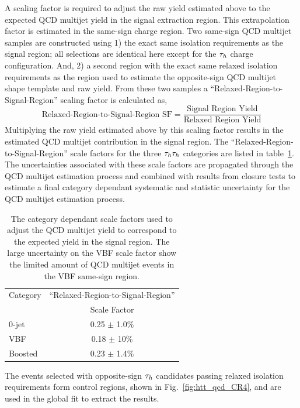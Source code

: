 A scaling factor is required to adjust the raw yield estimated above to the expected
QCD multijet yield in the signal extraction region. This extrapolation factor
is estimated in the same-sign charge region. Two same-sign QCD multijet samples are constructed
using 1) the exact same isolation requirements as the signal region; all selections are identical
here except for the $\tau_{h}$ charge configuration. And, 2) a second region with the exact 
same relaxed isolation requirements as the region used to estimate the opposite-sign
QCD multijet shape template and raw yield. From these two samples a ``Relaxed-Region-to-Signal-Region''
scaling factor is calculated as,
\[ \text{Relaxed-Region-to-Signal-Region SF} = \frac{\text{Signal Region Yield}}{\text{Relaxed Region Yield}} \]
Multiplying the raw yield estimated above by this scaling factor results in the estimated
QCD multijet contribution in the signal region. The ``Relaxed-Region-to-Signal-Region'' scale factors
for the three $\tau_{h}\tau_{h}$ categories are listed in table~\ref{tab:htt_qcd_sf}. The uncertainties associated
with these scale factors are propagated through the QCD multijet estimation process and combined
with results from closure tests to estimate a final category dependant systematic and statistic uncertainty
for the QCD multijet estimation process.

\begin{table}[htbp]
\centering
\begin{tabular}{|l|c|}
\hline
Category   &   ``Relaxed-Region-to-Signal-Region''   \\
           &   Scale Factor   \\
\hline
0-jet      &    0.25 $\pm$ 1.0\%  \\
VBF        &    0.18 $\pm$ 10\%  \\
Boosted    &    0.23 $\pm$ 1.4\%  \\  
\hline
\end{tabular}
\label{tab:htt_qcd_sf}
\caption{
The category dependant scale factors used to adjust the QCD multijet yield to correspond 
to the expected yield in the signal region. The large uncertainty on the VBF scale factor show the
limited amount of QCD multijet events in the VBF same-sign region. 
}
\end{table}

The events selected with opposite-sign $\tau_{h}$ candidates passing relaxed isolation requirements 
form control regions, shown in Fig.~\ref{fig:htt_qcd_CR4}, and are used in the global fit to extract the results.

